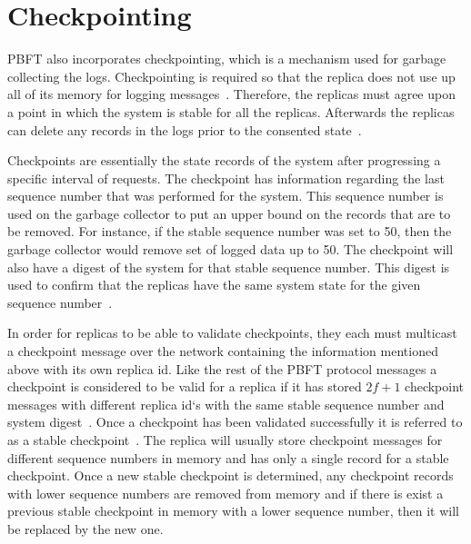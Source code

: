 \section{Checkpointing}
\label{sec:checkpoint}
\acrshort{PBFT} also incorporates checkpointing, which is a mechanism used for garbage collecting the logs. Checkpointing is required so that the replica does not use up all of its memory for logging messages~\cite[p.~261]{BOOK:BuildDepDistSyst}. Therefore, the replicas must agree upon a point in which the system is stable for all the replicas. Afterwards the replicas can delete any records in the logs prior to the consented state~\cites[p.~5]{PAPER:OGPBFT}[p.~410]{PAPER:PBFTRecovery}. 

Checkpoints are essentially the state records of the system after progressing a specific interval of requests. The checkpoint has information regarding the last sequence number that was performed for the system. This sequence number is used on the garbage collector to put an upper bound on the records that are to be removed. For instance, if the stable sequence number was set to 50, then the garbage collector would remove set of logged data up to 50. The checkpoint will also have a digest of the system for that stable sequence number. This digest is used to confirm that the replicas have the same system state for the given sequence number~\cites[p.~5]{PAPER:OGPBFT}[p.~410]{PAPER:PBFTRecovery}. 

In order for replicas to be able to validate checkpoints, they each must multicast a checkpoint message over the network containing the information mentioned above with its own replica id. Like the rest of the PBFT protocol messages a checkpoint is considered to be valid for a replica if it has stored $2f+1$ checkpoint messages with different replica id`s with the same stable sequence number and system digest~\cites[p.~261-262]{BOOK:BuildDepDistSyst}[p.~5]{PAPER:OGPBFT}[p.~410]{PAPER:PBFTRecovery}. Once a checkpoint has been validated successfully it is referred to as a stable checkpoint~\cites[p.~3]{PAPER:DPBFT}[p.~261]{BOOK:BuildDepDistSyst}. The replica will usually store checkpoint messages for different sequence numbers in memory and has only a single record for a stable checkpoint. Once a new stable checkpoint is determined, any checkpoint records with lower sequence numbers are removed from memory and if there is exist a previous stable checkpoint in memory with a lower sequence number, then it will be replaced by the new one.%

